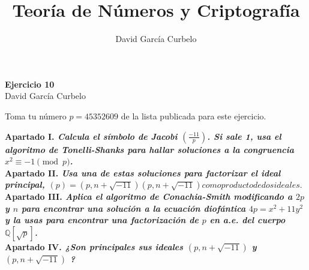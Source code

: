 \documentclass[fleqn]{article}
\author{David García Curbelo}
\title{Teoría de Números y Criptografía}
\def\Q{\mathds{Q}}
\begin{document}
    \begin{center}
        \LARGE{\textbf{Ejercicio 10}} \\
        \Large{David García Curbelo} \\
    \end{center}

    \vspace{1cm}
    Toma tu número $p = 45352609$ de la lista publicada para este ejercicio.

    \textbf{Apartado I. \textit{Calcula el símbolo de Jacobi $\left(\frac{-11}{p}\right)$. Si sale 1, usa el algoritmo de 
                                Tonelli-Shanks para hallar soluciones a la congruencia $x^2 \equiv -1 \pmod{p}$.}}\\
    

    \newpage
    \textbf{Apartado II. \textit{Usa una de estas soluciones para factorizar el ideal principal, 
                                $(p) = (p, n+ \sqrt{-11})(p, n+ \sqrt{-11}) como producto de dos ideales.$}}\\

    \newpage
    \textbf{Apartado III. \textit{Aplica el algoritmo de Conachia-Smith modificando a $2p$ y $n$ para encontrar
                                una solución a la ecuación diofántica $4p = x^2 + 11y^2 $ y la usas para encontrar 
                                una factorización de $p$ en a.e. del cuerpo $\Q[\sqrt{p}]$.}} \\


    \newpage
    \textbf{Apartado IV. \textit{¿Son principales sus ideales $(p, n+ \sqrt{-11})$ y $(p, n+ \sqrt{-11})$ ?}}\\
\end{document}

